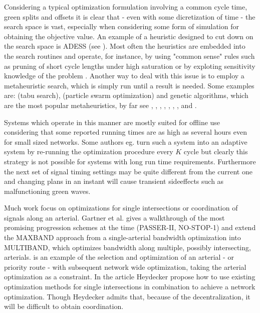 Considering a typical optimization formulation involving a common
cycle time, green splits and offsets it is clear that - even with some
dicretization of time - the search space is vast, especially when
considering some form of simulation for obtaining the objective
value. An example of a heuristic designed to cut down on the search
space is ADESS (see \cite{26}). Most often the heuristics are embedded
into the search routines and operate, for instance, by using "common
sense" rules such as pruning of short cycle lengths under high
saturation or by exploting sensitivity knowledge of the problem
\cite{40}.  Another way to deal with this issue is to employ a
metaheuristic search, which is simply run until a result is
needed. Some examples are: \cite{1} (tabu search), \cite{42} (particle
swarm optimization) and genetic algorithms, which are the most popular
metaheuristics, by far see \cite{13}, \cite{33}, \cite{43}, \cite{7},
\cite{41}, \cite{31}, \cite{27}, \cite{2} and \cite{26}.

Systems which operate in this manner are mostly suited for offline use
considering that some reported running times are as high as several
hours even for small sized networks.  Some authors eg. \cite{16} turn
such a system into an adaptive system by re-running the optimization
procedure every $K$ cycle but clearly this strategy is not possible
for systems with long run time requirements. Furthermore the next set
of signal timing settings may be quite different from the current one
and changing plans in an instant will cause transient sideeffects such
as malfunctioning green waves.

Much work focus on optimizations for single intersections or
coordination of signals along an arterial. Gartner et al. \cite{9}
gives a walkthrough of the most promising progression schemes at the
time (PASSER-II, NO-STOP-1) and extend the MAXBAND approach from a
single-arterial bandwidth optimization into MULTIBAND, which optimizes
bandwidth along multiple, possibly intersecting, arterials. \cite{6}
is an example of the selection and optimization of an arterial - or
priority route - with subsequent network wide optimization, taking the
arterial optimization as a constraint.  In the article \cite{24}
Heydecker propose how to use existing optimization methods for single
intersections in combination to achieve a network optimization. Though
Heydecker admits that, because of the decentralization, it will be
difficult to obtain coordination.

